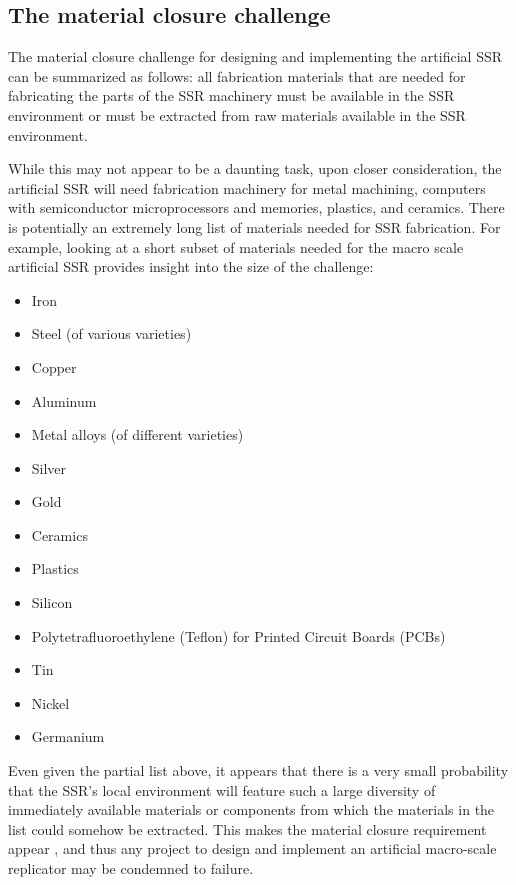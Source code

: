 \subsection[The material closure challenge]{The material closure challenge}

The material closure challenge
for designing and implementing the artificial SSR can be summarized as follows:
all fabrication materials that are needed for fabricating 
the parts of the SSR machinery must be available in the SSR environment or
must be extracted from raw materials available in the SSR
environment.

While this may not appear to be a daunting task, upon closer consideration,
the artificial SSR will need fabrication machinery for metal
machining, computers with semiconductor microprocessors and memories,
plastics, and ceramics.  There is potentially an extremely
long list of materials needed for SSR fabrication. For example, 
looking at a short
subset of materials needed for the macro scale artificial
SSR provides insight into the size of the challenge:

\begin{itemize}
\item Iron
\item Steel (of various varieties)
\item Copper
\item Aluminum
\item Metal alloys (of different varieties)
\item Silver
\item Gold
\item Ceramics
\item Plastics
\item Silicon
\item Polytetrafluoroethylene (Teflon) for Printed Circuit Boards
(PCBs)
\item Tin
\item Nickel
\item Germanium
\end{itemize}

Even given the partial list above, it appears that there is a very
small probability that the SSR's local environment 
will feature such a large diversity of immediately available
materials or components from which the materials in the list could somehow be
extracted. This makes the material closure requirement
appear , and thus any project to design and implement an
artificial macro-scale replicator may be condemned to failure. 

